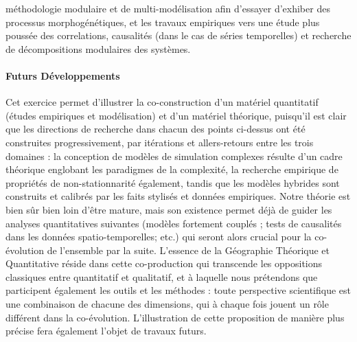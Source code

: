 méthodologie modulaire et de multi-modélisation afin d'essayer d'exhiber des processus morphogénétiques, et les travaux empiriques vers une étude plus poussée des correlations, causalités (dans le cas de séries temporelles) et recherche de décompositions modulaires des systèmes.





\paragraph{Futurs Développements}

Cet exercice permet d'illustrer la co-construction d'un matériel quantitatif (études empiriques et modélisation) et d'un matériel théorique, puisqu'il est clair que les directions de recherche dans chacun des points ci-dessus ont été construites progressivement, par itérations et allers-retours entre les trois domaines : la conception de modèles de simulation complexes résulte d'un cadre théorique englobant les paradigmes de la complexité, la recherche empirique de propriétés de non-stationnarité également, tandis que les modèles hybrides sont construits et calibrés par les faits stylisés et données empiriques. Notre théorie est bien sûr bien loin d'être mature, mais son existence permet déjà de guider les analyses quantitatives suivantes (modèles fortement couplés ; tests de causalités dans les données spatio-temporelles; etc.) qui seront alors crucial pour la co-évolution de l'ensemble par la suite. L'essence de la Géographie Théorique et Quantitative réside dans cette co-production qui transcende les oppositions classiques entre quantitatif et qualitatif, et à laquelle nous prétendons que participent également les outils et les méthodes : toute perspective scientifique est une combinaison de chacune des dimensions, qui à chaque fois jouent un rôle différent dans la co-évolution. L'illustration de cette proposition de manière plus précise fera également l'objet de travaux futurs.










